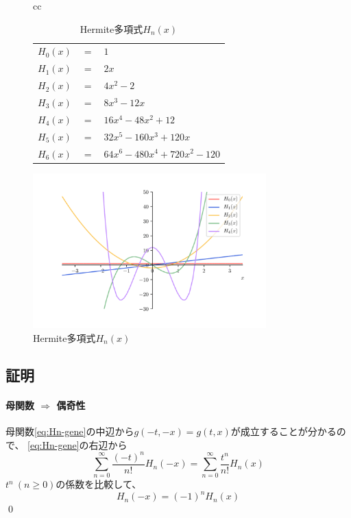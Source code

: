 \documentclass[../main/main]{subfiles}
\begin{document}
\vspace{-12pt}
\begin{figure}[tb]
\begin{tabular}{cc}
 \begin{minipage}{0.45\hsize}\small
    \begin{table}[H]
      \centering
      \small
      \caption{Hermite多項式$H_n(x)$}
      \begin{tabular}{ccl}\Hline
        $H_0(x)$ & $=$ & $1$ \\
        $H_1(x)$ & $=$ & $2x$ \\
        $H_2(x)$ & $=$ & $4x^2-2$ \\
        $H_3(x)$ & $=$ & $8x^3-12x$ \\
        $H_4(x)$ & $=$ & $16x^4 - 48x^2 + 12$ \\
        $H_5(x)$ & $=$ & $32x^5 - 160x^3 + 120x$ \\
        $H_6(x)$ & $=$ & $64x^6 - 480x^4 + 720x^2 - 120$ \\\hline
      \end{tabular}
    \end{table}
 \end{minipage}

 \begin{minipage}{0.55\hsize}
      \centering
      \includegraphics[width=90mm]{../fig/hermite/hermite.png}\vspace{-24pt}
      \caption{Hermite多項式$H_n(x)$}
  \end{minipage}
\end{tabular}
\end{figure}

\subsection*{証明}
\paragraph{母関数 $\Longrightarrow$ 偶奇性}
母関数\eqref{eq:Hn-gene}の中辺から$g(-t, -x) =g(t, x)$が成立することが分かるので、
\eqref{eq:Hn-gene}の右辺から
\begin{equation*}
  \sum_{n=0}^\infty \frac{(-t)^n}{n!} H_n(-x) = \sum_{n=0}^\infty \frac{t^n}{n!} H_n(x)
\end{equation*}
$t^n \ (n\geq 0)$の係数を比較して、
\begin{equation*}
  H_n(-x) = (-1)^n H_n(x)
\end{equation*}\qed
\end{document}
